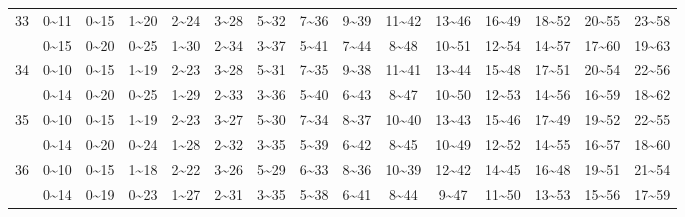 \documentclass[lang=cn,10pt]{elegantbook}
\begin{document}
\begin{longtable}{c|cccccccccccccc}
    33 & 0\textasciitilde11 & 0\textasciitilde15 & 1\textasciitilde20 & 2\textasciitilde24 & 3\textasciitilde28 & 5\textasciitilde32 & 7\textasciitilde36 & 9\textasciitilde39 & 11\textasciitilde42 & 13\textasciitilde46 & 16\textasciitilde49 & 18\textasciitilde52 & 20\textasciitilde55 & 23\textasciitilde58 \\
       & 0\textasciitilde15 & 0\textasciitilde20 & 0\textasciitilde25 & 1\textasciitilde30 & 2\textasciitilde34 & 3\textasciitilde37 & 5\textasciitilde41 & 7\textasciitilde44 & 8\textasciitilde48 & 10\textasciitilde51 & 12\textasciitilde54 & 14\textasciitilde57 & 17\textasciitilde60 & 19\textasciitilde63 \\
    34 & 0\textasciitilde10 & 0\textasciitilde15 & 1\textasciitilde19 & 2\textasciitilde23 & 3\textasciitilde28 & 5\textasciitilde31 & 7\textasciitilde35 & 9\textasciitilde38 & 11\textasciitilde41 & 13\textasciitilde44 & 15\textasciitilde48 & 17\textasciitilde51 & 20\textasciitilde54 & 22\textasciitilde56 \\
       & 0\textasciitilde14 & 0\textasciitilde20 & 0\textasciitilde25 & 1\textasciitilde29 & 2\textasciitilde33 & 3\textasciitilde36 & 5\textasciitilde40 & 6\textasciitilde43 & 8\textasciitilde47 & 10\textasciitilde50 & 12\textasciitilde53 & 14\textasciitilde56 & 16\textasciitilde59 & 18\textasciitilde62 \\
    35 & 0\textasciitilde10 & 0\textasciitilde15 & 1\textasciitilde19 & 2\textasciitilde23 & 3\textasciitilde27 & 5\textasciitilde30 & 7\textasciitilde34 & 8\textasciitilde37 & 10\textasciitilde40 & 13\textasciitilde43 & 15\textasciitilde46 & 17\textasciitilde49 & 19\textasciitilde52 & 22\textasciitilde55 \\
       & 0\textasciitilde14 & 0\textasciitilde20 & 0\textasciitilde24 & 1\textasciitilde28 & 2\textasciitilde32 & 3\textasciitilde35 & 5\textasciitilde39 & 6\textasciitilde42 & 8\textasciitilde45 & 10\textasciitilde49 & 12\textasciitilde52 & 14\textasciitilde55 & 16\textasciitilde57 & 18\textasciitilde60 \\
    36 & 0\textasciitilde10 & 0\textasciitilde15 & 1\textasciitilde18 & 2\textasciitilde22 & 3\textasciitilde26 & 5\textasciitilde29 & 6\textasciitilde33 & 8\textasciitilde36 & 10\textasciitilde39 & 12\textasciitilde42 & 14\textasciitilde45 & 16\textasciitilde48 & 19\textasciitilde51 & 21\textasciitilde54 \\
       & 0\textasciitilde14 & 0\textasciitilde19 & 0\textasciitilde23 & 1\textasciitilde27 & 2\textasciitilde31 & 3\textasciitilde35 & 5\textasciitilde38 & 6\textasciitilde41 & 8\textasciitilde44 & 9\textasciitilde47 & 11\textasciitilde50 & 13\textasciitilde53 & 15\textasciitilde56 & 17\textasciitilde59 \\

\end{longtable}
\end{document}
